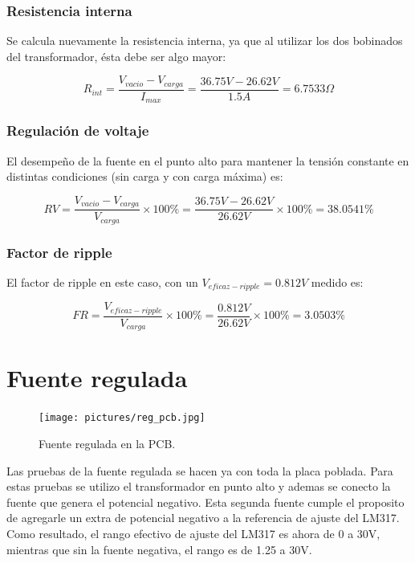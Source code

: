 \documentclass[chaptersright]{informeutn}
\begin{document}
        \subsubsection{Resistencia interna}

        Se calcula nuevamente la resistencia interna, ya que al utilizar los dos bobinados del transformador, ésta
        debe ser algo mayor:

        \begin{equation*}
            R_{int} = \frac{V_{vacio} - V_{carga}}{I_{max}}= \frac{36.75V - 26.62V}{1.5A} = 6.7533\Omega
        \end{equation*}

        \subsubsection{Regulación de voltaje}

        El desempeño de la fuente en el punto alto para mantener la tensión constante en distintas condiciones (sin carga
        y con carga máxima) es:

        \begin{equation*}
            RV = \frac{V_{vacio} -V_{carga}}{V_{carga}} \times 100\% = \frac{36.75V-26.62V}{26.62V} \times 100\% = 38.0541\%
        \end{equation*}

        \subsubsection{Factor de ripple}

        El factor de ripple en este caso, con un $V_{eficaz-ripple}=0.812V$ medido es:

        \begin{equation*}
            FR = \frac{V_{eficaz-ripple}}{V_{carga}} \times 100\% = \frac{0.812V}{26.62V} \times 100\% = 3.0503\%
        \end{equation*}

    \section{Fuente regulada}
      \begin{figure}
        \centering
        \texttt{[image: pictures/reg\_pcb.jpg]}
        \caption{Fuente regulada en la PCB.}
      \end{figure}

      Las pruebas de la fuente regulada se hacen ya con toda la placa poblada. Para estas pruebas se utilizo el
      transformador en punto alto y ademas se conecto la fuente que genera el potencial negativo. Esta segunda fuente
      cumple el proposito de agregarle un extra de potencial negativo a la referencia de ajuste del LM317. Como
      resultado, el rango efectivo de ajuste del LM317 es ahora de 0 a 30V, mientras que sin la fuente negativa,
      el rango es de 1.25 a 30V.
\end{document}
